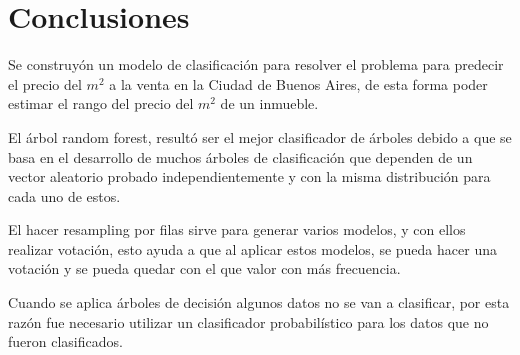  
\section{Conclusiones}

Se construyón un modelo de clasificación para resolver el problema para predecir el precio del $m^2$  
a la venta en la Ciudad de Buenos Aires, de esta forma poder estimar el rango del precio del $m^2$ de un inmueble.

El árbol random forest, resultó ser el mejor clasificador de árboles debido a que se basa en el desarrollo de
muchos árboles de clasificación que dependen de un vector aleatorio probado independientemente y con la 
misma distribución para cada uno de estos.

El hacer resampling por filas sirve para generar varios modelos, y con ellos realizar votación, esto ayuda
a que al aplicar estos modelos, se pueda hacer una votación y se pueda quedar con el que valor con más frecuencia.

Cuando se aplica árboles de decisión algunos datos no se van a clasificar, por esta razón fue necesario utilizar
un clasificador probabilístico para los datos que no fueron clasificados.
